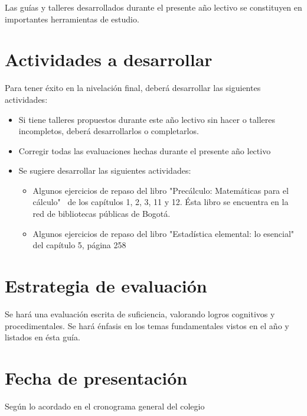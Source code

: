 \documentclass[letterpaper,11pt,twoside]{article}
\begin{document}
Las guías y talleres desarrollados durante el presente año lectivo se constituyen en importantes herramientas de estudio.
\section*{Actividades a desarrollar}
Para tener éxito en la nivelación final, deberá desarrollar las siguientes actividades:
\begin{itemize}
\item Si tiene talleres propuestos durante este año lectivo sin hacer o talleres incompletos, deberá desarrollarlos o completarlos.
\item Corregir todas las evaluaciones hechas durante el presente año lectivo
\item Se sugiere desarrollar las siguientes actividades:
\begin{itemize}
\item Algunos ejercicios de repaso del libro "Precálculo: Matemáticas para el cálculo"~\cite{stewart} de los capítulos 1, 2, 3, 11 y 12. Ésta libro se encuentra en la red de bibliotecas públicas de Bogotá.
\item Algunos ejercicios de repaso del libro "Estadística elemental: lo esencial" del capítulo 5, página 258~\cite{esencial}
\end{itemize}
\end{itemize}

\section*{Estrategia de evaluación}
Se hará una evaluación escrita de suficiencia, valorando logros cognitivos y procedimentales. Se hará énfasis en los temas fundamentales vistos en el año y listados en ésta guía.
\section*{Fecha de presentación}
Según lo acordado en el cronograma general del colegio
\end{document}

